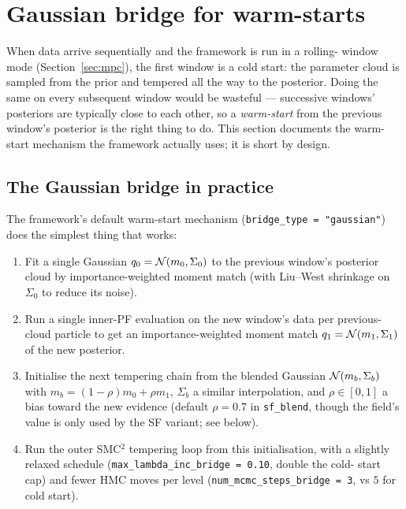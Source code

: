 \section{Gaussian bridge for warm-starts} \label{sec:bridge}

When data arrive sequentially and the framework is run in a rolling-
window mode (Section~\ref{sec:mpc}), the first window is a cold start:
the parameter cloud is sampled from the prior and tempered all the
way to the posterior. Doing the same on every subsequent window would
be wasteful --- successive windows' posteriors are typically close to
each other, so a \emph{warm-start} from the previous window's
posterior is the right thing to do. This section documents the
warm-start mechanism the framework actually uses; it is short by
design.

\subsection{The Gaussian bridge in practice}

The framework's default warm-start mechanism (\texttt{bridge\_type =
"gaussian"}) does the simplest thing that works:

\begin{enumerate}
  \item Fit a single Gaussian
        $q_0 = \mathcal{N}(m_0, \Sigma_0)$ to the previous window's
        posterior cloud by importance-weighted moment match (with
        Liu--West shrinkage on $\Sigma_0$ to reduce its noise).
  \item Run a single inner-PF evaluation on the new window's data per
        previous-cloud particle to get an importance-weighted moment
        match $q_1 = \mathcal{N}(m_1, \Sigma_1)$ of the new posterior.
  \item Initialise the next tempering chain from the blended Gaussian
        $\mathcal{N}(m_b, \Sigma_b)$ with $m_b = (1 - \rho) m_0 + \rho m_1$,
        $\Sigma_b$ a similar interpolation, and $\rho \in [0, 1]$ a
        bias toward the new evidence (default $\rho = 0.7$ in
        \texttt{sf\_blend}, though the field's value is only used by
        the SF variant; see below).
  \item Run the outer SMC$^2$ tempering loop from this initialisation,
        with a slightly relaxed schedule
        (\texttt{max\_lambda\_inc\_bridge = 0.10}, double the cold-
        start cap) and fewer HMC moves per level
        (\texttt{num\_mcmc\_steps\_bridge = 3}, vs $5$ for cold start).
\end{enumerate}


